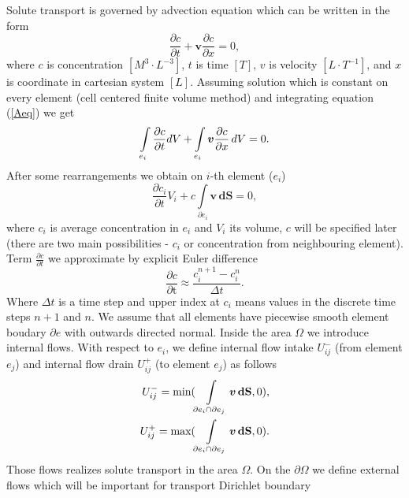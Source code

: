 Solute transport is governed by advection equation which can be written in the form
\begin{equation}
 \frac{\partial c}{\partial t} + \boldsymbol{v} \frac{\partial c}{\partial x}  = 0, \label{Aeq}
\end{equation}
where $c$ is concentration $[M^3 \cdot L^{-3}]$, $t$ is time $[T]$, $v$ is velocity $[L \cdot T^{-1}]$, and $x$ is coordinate in cartesian system $[L]$.
Assuming solution which is constant on every element (cell centered finite volume method) and integrating equation (\ref{Aeq}) we get
    \begin{equation}
    \int\limits_{e_i} \frac{\partial c}{\partial t} dV + \int\limits_{e_i} \boldsymbol{v} \frac{\partial c}{\partial x} \, dV = 0. \notag 
    \end{equation}
    After some rearrangements we obtain on $i$-th element ($e_i$)
    \begin{equation}
    \frac{\partial c_i}{\partial t}  V_{i} + c \int\limits_{\partial e_i }  \boldsymbol{v} \, \mathbf{dS} = 0, \label{Aeqint} 
    \end{equation}
  where $c_i$ is average concentration in $e_i$ and $V_{i}$ its volume, $c$ will be specified later (there are two main possibilities - $c_i$ or concentration from neighbouring element).
    Term $\frac{\partial c}{\partial t}$ we approximate by explicit Euler difference
    \begin{equation}
     \frac{\partial c}{\partial \textrm{t}} \approx \frac{c_{i}^{n+1} - c_{i}^n}{\Delta t}. \label{expliciteuler}
    \end{equation}
    Where $\Delta t$ is a time step and upper index at $c_i$ means values in the discrete time steps $n+1$ and $n$.
    We assume that all elements have piecewise smooth element boudary $\partial e$ with outwards directed normal. Inside the area $\Omega$ we introduce internal flows.
    With respect to $e_i$, we define internal flow intake $U_{ij}^{-}$ (from element $e_j$) and
    internal flow drain $U_{ij}^{+}$ (to element $e_j$) as follows
    \begin{eqnarray}     
      U_{ij}^{-} = \text{min}(\int\limits_{\partial e_i \cap \partial e_j } \boldsymbol{v} \, \mathbf{dS},0), \notag \\
      U_{ij}^{+} = \text{max}(\int\limits_{\partial e_i \cap \partial e_j } \boldsymbol{v} \, \mathbf{dS},0). \label{iflux}  
    \end{eqnarray}
  Those flows realizes solute transport in the area $\Omega$. On the $\partial\Omega$ we define external flows which will be important for transport Dirichlet boundary  
